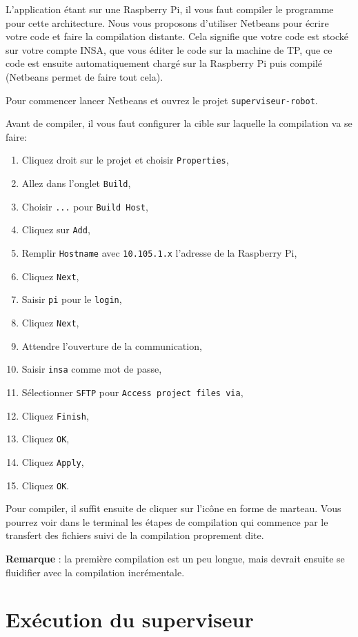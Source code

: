 \documentclass[11pt]{paper}
\newcommand{\raspi}{Raspberry Pi\xspace}
\begin{document}
L'application étant sur une \raspi, il vous faut compiler le programme pour cette architecture. Nous vous proposons d'utiliser Netbeans pour écrire votre code et faire la compilation distante. Cela signifie que votre code est stocké sur votre compte INSA, que vous éditer le code sur la machine de TP, que ce code est ensuite automatiquement chargé sur la \raspi puis compilé (Netbeans permet de faire tout cela).

Pour commencer lancer Netbeans et ouvrez le projet {\tt superviseur-robot}.

Avant de compiler, il vous faut configurer la cible sur laquelle la compilation va se faire:
\begin{enumerate}
\item Cliquez droit sur le projet et choisir {\tt Properties},
\item Allez dans l'onglet {\tt Build},
\item Choisir {\tt ...} pour {\tt Build Host},
\item Cliquez sur {\tt Add},
\item Remplir {\tt Hostname} avec {\tt 10.105.1.x} l'adresse de la \raspi,
\item Cliquez {\tt Next},
\item Saisir {\tt pi} pour le {\tt login},
\item Cliquez {\tt Next},
\item Attendre l'ouverture de la communication,
\item Saisir {\tt insa} comme mot de passe,
\item Sélectionner {\tt  SFTP} pour {\tt Access project files via},
\item Cliquez {\tt Finish},
\item Cliquez {\tt OK},
\item Cliquez {\tt Apply},
\item Cliquez {\tt OK}.
\end{enumerate}

Pour compiler, il suffit ensuite de cliquer sur l'icône en forme de marteau. Vous pourrez voir dans le terminal les étapes de compilation qui commence par le transfert des fichiers suivi de la compilation proprement dite.

{\bf Remarque} : la première compilation est un peu longue, mais devrait ensuite se fluidifier avec la compilation incrémentale.


\section{Exécution du superviseur}
\label{sec:utilisation}
\end{document}

